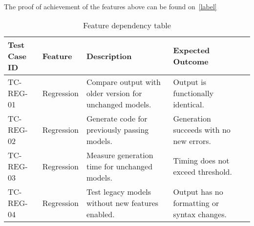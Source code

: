 The proof of achievement of the features above can be found on~\ref{label}

\bgroup
{}
\begin{xltabular}{\textwidth}{X X X X X}
\caption{Feature dependency table}
\label{tab:reg_tests_1}\\
\toprule
{}%
Test Case ID & Feature & Description & Expected Outcome \\
\midrule
TC-REG-01 & Regression & Compare output with older version for unchanged models. & Output is functionally identical. \\
TC-REG-02 & Regression & Generate code for previously passing models. & Generation succeeds with no new errors. \\
TC-REG-03 & Regression & Measure generation time for unchanged models. & Timing does not exceed threshold. \\
TC-REG-04 & Regression & Test legacy models without new features enabled. & Output has no formatting or syntax changes. \\
\end{xltabular}




